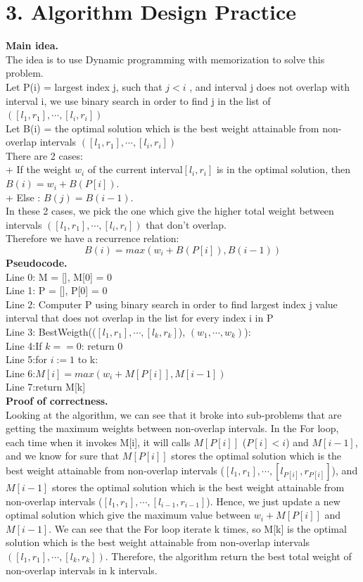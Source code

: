 \documentclass[11pt]{article}
\newcommand{\tab}{\hspace*{2em}}
\begin{document}
\section*{3. Algorithm Design Practice}

\noindent
\textbf{Main idea.}\\
The idea is to use Dynamic programming with memorization to solve this problem.\\
Let P(i) = largest index j, such that $j < i$ , and interval j does not overlap with interval i, we use binary search in order to find j in the list of $([l_1,r_1], \cdots, [l_i,r_i])$\\
Let B(i) = the optimal solution which is the best weight attainable from non-overlap intervals $([l_1,r_1], \cdots, [l_i,r_i])$\\
There are 2 cases:\\
 + If the weight $w_i$ of the current interval$[l_i,r_i]$ is in the optimal solution, then $B(i) = w_i + B(P[i])$.\\
 + Else : $B(j) = B(i-1)$.\\
In these 2 cases, we pick the one which give the higher total weight between intervals $([l_1,r_1], \cdots, [l_i,r_i])$ that don't overlap.\\
Therefore we have a recurrence relation:
$$B(i) = max(w_i + B(P[i]), B(i-1))$$
\noindent
\textbf{Pseudocode.}\\
Line 0: M = [], M[0] = 0\\
Line 1: P = [], P[0] = 0\\
Line 2: Computer P using  binary search in order to find largest index j value interval that does not overlap in the list for every index i in P\\
Line 3: BestWeigth(($[l_1,r_1], \cdots, [l_k,r_k]$), $(w_1,\cdots, w_k)$):\\
Line 4:\tab If $k == 0$: return 0\\
Line 5:\tab for $i:= 1$ to k:\\
Line 6:\tab\tab $M[i] = max(w_i + M[P[i]], M[i - 1])$\\
Line 7:\tab return M[k]\\

\noindent
\textbf{Proof of correctness.}\\
Looking at the algorithm, we can see that it broke into sub-problems that are getting the maximum weights between non-overlap intervals. In the For loop, each time when it invokes M[i], it will calls $M[P[i]]$ ($P[i] < i$) and $M[i-1]$, and we know for sure that $M[P[i]]$ stores the optimal solution which is the best weight attainable from non-overlap intervals ($[l_1,r_1], \cdots, [l_{P[i]},r_{P[i]}]$), and $M[i-1]$ stores the optimal solution which is the best weight attainable from non-overlap intervals ($[l_1,r_1], \cdots, [l_{i-1},r_{i-1}]$). Hence, we just update a new optimal solution which give the maximum value between $w_i + M[P[i]]$ and $ M[i - 1]$. We can see that the For loop iterate k times, so M[k] is the optimal solution which is the best weight attainable from non-overlap intervals $([l_1,r_1], \cdots, [l_k,r_k])$. Therefore, the algorithm return the best total weight of non-overlap intervals in k intervals.\\
\end{document}
